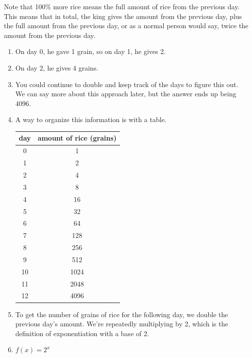 \documentclass[noauthor]{ximera}
\begin{document}
\begin{problem}
\begin{explanation}
    Note that 100\% more rice means the full amount of rice from the previous day. This means that in total, the king
    gives the amount from the previous day, plus the full amount from the previous day, or as a normal person would say,
    twice the amount from the previous day.
\begin{enumerate}
    \item On day 0, he gave 1 grain, so on day 1, he gives 2.
    \item On day 2, he gives 4 grains.
    \item You could continue to double and keep track of the days to figure this out. We can say more about this approach later, but the answer ends up being 4096.
    \item A way to organize this information is with a table. 
    \begin{table}[]
\centering
\begin{tabular}{c|c}
day & amount of rice (grains) \\ \hline
0 & 1 \\
1 & 2 \\
2 & 4 \\
3 & 8 \\
4 & 16 \\
5 & 32 \\
6 & 64 \\
7 & 128 \\
8 & 256 \\
9 & 512 \\
10 & 1024 \\
11 & 2048 \\
12 & 4096
\end{tabular}
\end{table}
    \item To get the number of grains of rice for the following day, we double the previous day's amount. We're repeatedly multiplying by 2, which is the definition of exponentiation with a base of 2.
    \item \(f(x) = 2^x\)
\end{enumerate}
\end{explanation}
\end{problem}
\end{document}
